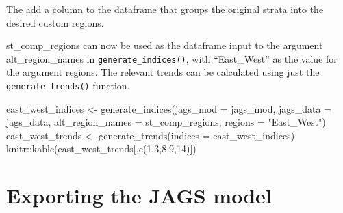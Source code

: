 \documentclass[
]{book}
\newenvironment{Shaded}{\begin{snugshade}}{\end{snugshade}}
\newcommand{\AttributeTok}[1]{\textcolor[rgb]{0.77,0.63,0.00}{#1}}
\newcommand{\DecValTok}[1]{\textcolor[rgb]{0.00,0.00,0.81}{#1}}
\newcommand{\FunctionTok}[1]{\textcolor[rgb]{0.00,0.00,0.00}{#1}}
\newcommand{\NormalTok}[1]{#1}
\newcommand{\OtherTok}[1]{\textcolor[rgb]{0.56,0.35,0.01}{#1}}
\newcommand{\SpecialCharTok}[1]{\textcolor[rgb]{0.00,0.00,0.00}{#1}}
\newcommand{\StringTok}[1]{\textcolor[rgb]{0.31,0.60,0.02}{#1}}
\begin{document}
The add a column to the dataframe that groups the original strata into the desired custom regions.

\begin{Shaded}
\end{Shaded}

st\_comp\_regions can now be used as the dataframe input to the argument alt\_region\_names in \texttt{generate\_indices()}, with ``East\_West'' as the value for the argument regions. The relevant trends can be calculated using just the \texttt{generate\_trends()} function.

\begin{Shaded}
\begin{Highlighting}[]
\NormalTok{east\_west\_indices }\OtherTok{\textless{}{-}} \FunctionTok{generate\_indices}\NormalTok{(}\AttributeTok{jags\_mod =}\NormalTok{ jags\_mod,}
                                      \AttributeTok{jags\_data =}\NormalTok{ jags\_data,}
                                      \AttributeTok{alt\_region\_names =}\NormalTok{ st\_comp\_regions,}
                                      \AttributeTok{regions =} \StringTok{"East\_West"}\NormalTok{)}
\NormalTok{east\_west\_trends }\OtherTok{\textless{}{-}} \FunctionTok{generate\_trends}\NormalTok{(}\AttributeTok{indices =}\NormalTok{ east\_west\_indices)}
\NormalTok{knitr}\SpecialCharTok{::}\FunctionTok{kable}\NormalTok{(east\_west\_trends[,}\FunctionTok{c}\NormalTok{(}\DecValTok{1}\NormalTok{,}\DecValTok{3}\NormalTok{,}\DecValTok{8}\NormalTok{,}\DecValTok{9}\NormalTok{,}\DecValTok{14}\NormalTok{)])}
\end{Highlighting}
\end{Shaded}

\hypertarget{exporting-the-jags-model}{%
\section{Exporting the JAGS model}\label{exporting-the-jags-model}}
\end{document}
